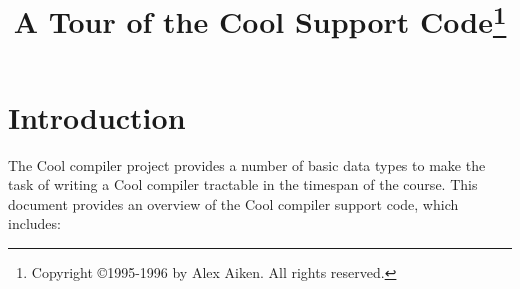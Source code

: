 
\newcommand {\OP}[1]{\mbox{\sc #1}}
\newcommand {\op}[1]{\mbox{\sc #1}}
\newcommand {\mm}[1]{\mbox{\rm #1}\;}
\newcommand {\id}[1]{\mbox{\it #1\ }}

\newcommand {\ASSIGN}{\leftarrow }
\newcommand {\MIN}{\OP{min} }
\newcommand {\MOD}{\; {\bf{\rm mod}} \; } 
\newcommand {\LAMBDA}{{\bf \lambda\ }}
\newcommand {\FALSE}{{\em FALSE\ }}


\newcommand {\And}{\wedge}
\newcommand {\Or}{\vee}

\newcommand {\thus}{{\dot{. \: .}\;}}

\newcommand {\bigO}[1]{{\cal O}(#1)}

\newcommand {\app}{\!\!:\!}
\newcommand {\hastype}{::}
\newcommand{\hast}{:}
\newcommand{\qt}[1]{\mbox{``#1''}}
\newcommand{\TexComment}[1]{}

\newcommand{\dq}{\m{\tt "}}
\newcommand{\flatqt}[1]{\m{\dq #1 \dq}}
\newcommand{\seq}{\subseteq}
\newcommand{\derives}{\vdash}

\newcommand{\grammar}{::=}
\newcommand{\gor}{\,|\,}

\newcommand{\infrule}[2]{\displaystyle{\displaystyle\strut{#1}} \over %
                                        {\displaystyle\strut {#2}}}
\newcommand{\cinfrule}[3]{\parbox{14cm}{\hfil$\infrule{#1}{#2}$\hfil}\parbox{4cm}{$\,#3$\hfil}}



\title{A Tour of the Cool Support Code\thanks{
Copyright \copyright 1995-1996 by Alex Aiken.
All rights reserved.}}  
\date{ }
\author{ }
\maketitle

\section{Introduction}

The Cool compiler project provides a number of basic data types to
make the task of writing a Cool compiler tractable in the timespan of
the course.  This document provides an overview of the Cool compiler
support code, which includes:

